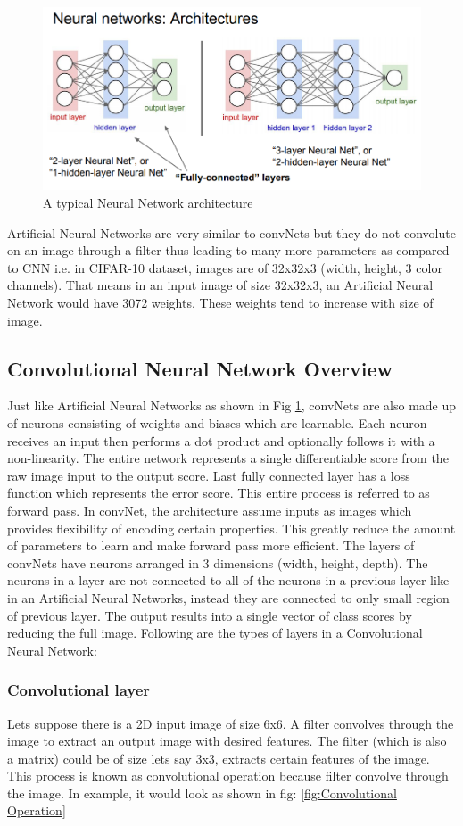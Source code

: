 \documentclass[11pt]{article}
\begin{document}
\begin{figure}[H]
	\centering
	\includegraphics[width=.6\linewidth]{files/NN.jpeg}
	\caption{A typical Neural Network architecture}
	\label{fig: Neural Network architecture}
\end{figure}

Artificial Neural Networks are very similar to convNets but they do not convolute on an image through a filter thus leading to many more parameters as compared to CNN i.e. in CIFAR-10 dataset, images are of 32x32x3 (width, height, 3 color channels). That means in an input image of size 32x32x3, an Artificial Neural Network would have 3072 weights. These weights tend to increase with size of image.

\subsection{Convolutional Neural Network Overview}
Just like Artificial Neural Networks as shown in Fig \ref{fig: Neural Network architecture}, convNets are also made up of neurons consisting of weights and biases which are learnable. Each neuron receives an input then performs a dot product and optionally follows it with a non-linearity. The entire network represents a single differentiable score from the raw image input to the output score. Last fully connected layer has a loss function which represents the error score. This entire process is referred to as forward pass. In convNet, the architecture assume inputs as images which provides flexibility of encoding certain properties. This greatly reduce the amount of parameters to learn and make forward pass more efficient. The layers of convNets have neurons arranged in 3 dimensions (width, height, depth). The neurons in a layer are not connected to all of the neurons in a previous layer like in an Artificial Neural Networks, instead they are connected to only small region of previous layer. The output results into a single vector of class scores by reducing the full image. Following are the types of layers in a Convolutional Neural Network:

\subsubsection{Convolutional layer}
Lets suppose there is a 2D input image of size 6x6. A filter convolves through the image to extract an output image with desired features. The filter (which is also a matrix) could be of size lets say 3x3, extracts certain features of the image. This process is known as convolutional operation because filter convolve through the image. In example, it would look as shown in fig: \ref{fig:Convolutional Operation}
\end{document}
